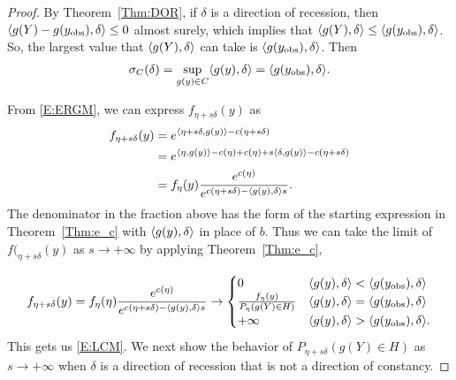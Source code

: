 \begin{proof}
By Theorem~\ref{Thm:DOR}, if $\delta$ is a direction of recession, then 
$\langle g(Y) - g(y_{\text{obs}}), \delta \rangle \leq 0$ almost surely, which implies 
that $\langle g(Y), \delta \rangle \leq \langle g(y_{\text{obs}}), \delta \rangle$.  
So, the largest value that $\langle g(Y), \delta \rangle$ can take is 
$\langle g(y_{\text{obs}}), \delta \rangle$.  Then 
\begin{align*}
\sigma_C(\delta) = \sup_{g(y) \in C}\langle g(y), \delta \rangle = 
\langle g(y_{\text{obs}}), \delta \rangle.
\end{align*}

From \eqref{E:ERGM}, we can express $f_{\eta+s\delta}(y)$ as
\begin{align*}
 f_{\eta+s\delta}(y) &= e^{ \langle \eta+s\delta,g(y) \rangle - c(\eta+s\delta)  } \\
 &= e^{ \langle \eta,g(y) \rangle -c(\eta)+c(\eta) + s\langle \delta,g(y) \rangle - c(\eta+s\delta) } \\
 	&= f_\eta(y) \frac{e^{c(\eta)}}{e^{ c(\eta+s\delta) - \langle g(y),\delta \rangle
s } }.
\end{align*}
The denominator in the fraction above has the form of the starting expression in 
Theorem~\ref{Thm:e_c} with $\langle g(y),\delta \rangle$ in place of $b$.
Thus we can take the limit of $f(_{\eta+s\delta}(y)$ as
$s \to +\infty$ by applying Theorem~\ref{Thm:e_c},

\begin{align*}
	f_{\eta+s\delta}(y) = f_\eta(\eta) \frac{e^{c(\eta)}}{e^{ c(\eta+s
\delta) - \langle g(y),\delta \rangle s } } 
	\to	
			\begin{cases} 
			0 					& \langle g(y),\delta \rangle < \langle g(y_{\text{obs}}),\delta \rangle \\
			\frac{f_\eta(y)}{P_\eta(g(Y) \in H)} 	& 
								\langle g(y),\delta \rangle = \langle g(y_{\text{obs}}),\delta \rangle \\
			+\infty				& \langle g(y),\delta \rangle > \langle g(y_{\text{obs}}),\delta \rangle.
			\end{cases}
\end{align*}
This gets us \eqref{E:LCM}.  We next show the behavior of 
$P_{\eta+s\delta}(g(Y) \in H)$ as $s \to +\infty$ when $\delta$ is a direction of
recession that is not a direction of constancy.


\end{proof}
